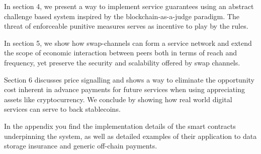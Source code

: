In section 4, we present a way to implement service guarantees using an abstract
challenge based system inspired by the blockchain-as-a-judge paradigm. The threat
of enforceable punitive measures serves as incentive to play by the rules.

In section 5, we show how swap-channels can form a service network and extend the
scope of economic interaction between peers both in terms of reach and frequency, yet
preserve the security and scalability offered by swap channels.

Section 6 discusses price signalling and shows a way to eliminate the opportunity cost
inherent in advance payments for future services when using appreciating assets like cryptocurrency.
We conclude by showing how real world digital services can serve to back stablecoins.

In the appendix you find the implementation details of the smart contracts underpinning the system, as well as detailed examples of their application to data storage insurance and generic off-chain payments.
